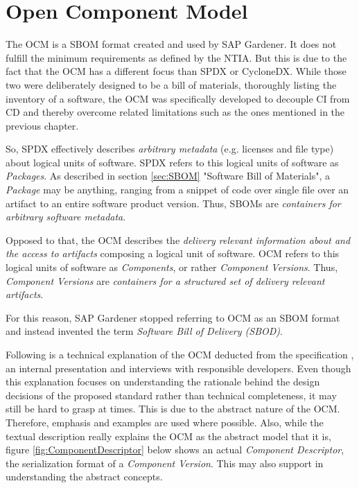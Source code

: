\section{Open Component Model} \label{sec:Open Component Model}
The OCM is a SBOM format created and used by SAP Gardener. It does not fulfill the minimum requirements as defined by the NTIA. But this is due to the fact that the OCM has a different focus than SPDX or CycloneDX. While those two were deliberately designed to be a bill of materials, thoroughly listing the inventory of a software, the OCM was specifically developed to decouple CI from CD and thereby overcome related limitations such as the ones mentioned in the previous chapter.\par 
So, SPDX effectively describes \emph{arbitrary metadata} (e.g. licenses and file type) about logical units of software. SPDX refers to this logical units of software as \emph{Packages}. As described in section \ref{sec:SBOM} "Software Bill of Materials", a \emph{Package} may be anything, ranging from a snippet of code over single file over an artifact to an entire software product version. Thus, SBOMs are \emph{containers for arbitrary software metadata}.\par
Opposed to that, the OCM describes the \emph{delivery relevant information about and the access to artifacts} composing a logical unit of software. OCM refers to this logical units of software as \emph{Components}, or rather \emph{Component Versions}. Thus, \emph{Component Versions} are  \emph{containers for a structured set of delivery relevant artifacts}.\par 
For this reason, SAP Gardener stopped referring to OCM as an SBOM format and instead invented the term \emph{Software Bill of Delivery (SBOD)}.\par
Following is a technical explanation of the OCM deducted from the specification \cite{OCMSpec}, an internal presentation \cite{OCMInternalPresentation} and interviews with responsible developers. Even though this explanation focuses on understanding the rationale behind the design decisions of the proposed standard rather than technical completeness, it may still be hard to grasp at times. This is due to the abstract nature of the OCM. Therefore, emphasis and examples are used where possible. Also, while the textual description really explains the OCM as the abstract model that it is, figure \ref{fig:ComponentDescriptor} below shows an actual \emph{Component Descriptor}, the serialization format of a \emph{Component Version}. This may also support in understanding the abstract concepts.


